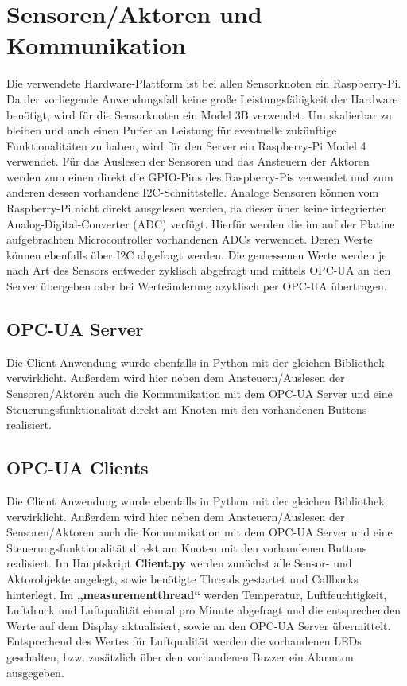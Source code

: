 \section{Sensoren/Aktoren und Kommunikation}\label{ch:sensoren_kommunikation}

\newline Die verwendete Hardware-Plattform ist bei allen Sensorknoten ein Raspberry-Pi. Da der vorliegende Anwendungsfall keine große Leistungsfähigkeit der Hardware benötigt, wird für die Sensorknoten ein Model 3B verwendet. Um skalierbar zu bleiben und auch einen Puffer an Leistung für eventuelle zukünftige Funktionalitäten zu haben, wird für den Server ein Raspberry-Pi Model 4 verwendet.
\newline Für das Auslesen der Sensoren und das Ansteuern der Aktoren werden zum einen direkt die GPIO-Pins des Raspberry-Pis verwendet und zum anderen dessen vorhandene I2C-Schnittstelle. Analoge Sensoren können vom Raspberry-Pi nicht direkt ausgelesen werden, da dieser über keine integrierten Analog-Digital-Converter (ADC) verfügt. Hierfür werden die im auf der Platine aufgebrachten Microcontroller vorhandenen ADCs verwendet. Deren Werte können ebenfalls über I2C abgefragt werden.
\newline Die gemessenen Werte werden je nach Art des Sensors entweder zyklisch abgefragt und mittels OPC-UA an den Server übergeben oder bei Werteänderung azyklisch per OPC-UA übertragen.

\subsection{OPC-UA Server}
Die Client Anwendung wurde ebenfalls in Python mit der gleichen Bibliothek verwirklicht. Außerdem wird hier neben dem Ansteuern/Auslesen der Sensoren/Aktoren auch die Kommunikation mit dem OPC-UA Server und eine Steuerungsfunktionalität direkt am Knoten mit den vorhandenen Buttons realisiert. 

\subsection{OPC-UA Clients}
\newline Die Client Anwendung wurde ebenfalls in Python mit der gleichen Bibliothek verwirklicht. Außerdem wird hier neben dem Ansteuern/Auslesen der Sensoren/Aktoren auch die Kommunikation mit dem OPC-UA Server und eine Steuerungsfunktionalität direkt am Knoten mit den vorhandenen Buttons realisiert. 
\newline Im Hauptskript \textbf{Client.py} werden zunächst alle Sensor- und Aktorobjekte angelegt, sowie benötigte Threads gestartet und Callbacks hinterlegt. 
\newline Im \textbf{„measurement\textunderscore thread“} werden Temperatur, Luftfeuchtigkeit, Luftdruck und Luftqualität einmal pro Minute abgefragt und die entsprechenden Werte auf dem Display aktualisiert, sowie an den OPC-UA Server übermittelt. Entsprechend des Wertes für Luftqualität werden die vorhandenen LEDs geschalten, bzw. zusätzlich über den vorhandenen Buzzer ein Alarmton ausgegeben.

